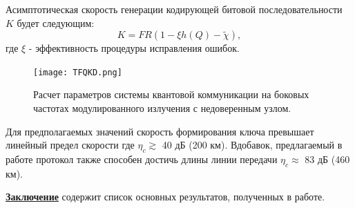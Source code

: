 Асимптотическая скорость генерации кодирующей битовой последовательности $K$ будет следующим:
\begin{equation}
     K=FR(1-\xi h(Q)-\tilde{\chi}),
\end{equation}
где $\xi$ - эффективность процедуры исправления ошибок. 




\begin{figure}
	\texttt{[image: TFQKD.png]}
	\caption{Расчет параметров системы квантовой коммуникации на боковых частотах модулированного излучения с недоверенным узлом.}
	\label{fig:fig2}
\end{figure}


Для предполагаемых значений скорость формирования ключа превышает линейный предел скорости \cite{pirandola2017fundamental} где $\eta_c \gtrsim$ 40 дБ (200 км). Вдобавок, предлагаемый в работе протокол также способен достичь длины линии передачи $\eta_c\approx$ 83 дБ (460 км).


 \underline{\textbf{Заключение}} содержит список основных результатов, полученных в работе. 

  

